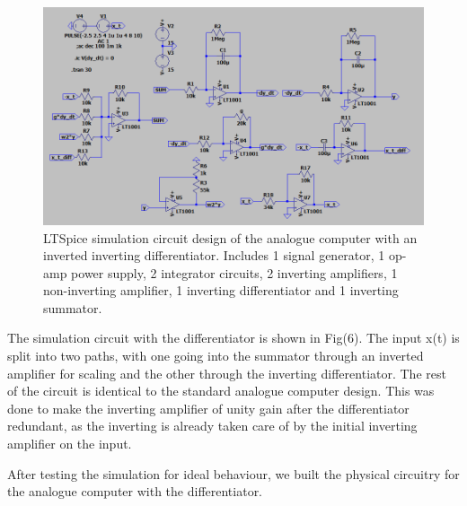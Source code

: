\documentclass[journal]{Imperial_lab_report}
\begin{document}
\begin{figure}[h]
    \centering
    \includegraphics[scale = 0.3]{final_sim_diff.PNG}
    \caption{LTSpice simulation circuit design of the analogue computer with an inverted inverting differentiator. Includes 1 signal generator, 1 op-amp power supply, 2 integrator circuits, 2 inverting amplifiers, 1 non-inverting amplifier, 1 inverting differentiator and 1 inverting summator.}
\end{figure}

The simulation circuit with the differentiator is shown in Fig(6). The input x(t) is split into two paths, with one going into the summator through an inverted amplifier for scaling and the other through the inverting differentiator. The rest of the circuit is identical to the standard analogue computer design. This was done to make the inverting amplifier of unity gain after the differentiator redundant, as the inverting is already taken care of by the initial inverting amplifier on the input.

After testing the simulation for ideal behaviour, we built the physical circuitry for the analogue computer with the differentiator.
\end{document}
